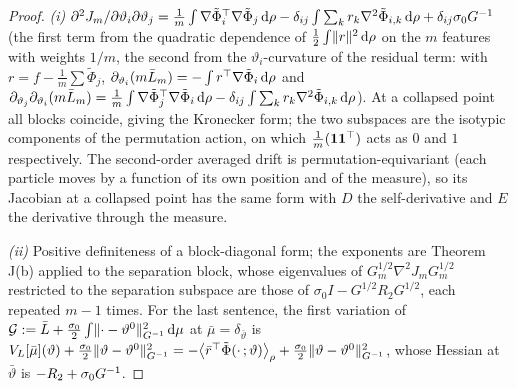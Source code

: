 \begin{proof}
\textit{(i)} $\partial^2J_m/\partial\vartheta_i\partial\vartheta_j
= \frac1m\int\nabla\tilde\Phi_i^\top\nabla\tilde\Phi_j\,\mathrm{d}\rho - \delta_{ij}\int\sum_kr_k\nabla^2\tilde\Phi_{i,k}\,\mathrm{d}\rho
+ \delta_{ij}\sigma_0G^{-1}$ (the first term from the quadratic dependence of $\frac12\int\lVert r\rVert^2\,\mathrm{d}\rho$ on the
$m$ features with weights $1/m$, the second from the $\vartheta_i$-curvature of the residual term:
with $r = f - \frac1m\sum\tilde\Phi_j$,
$\partial_{\vartheta_i}(m\bar L_m) = -\int r^\top\nabla\tilde\Phi_i\,\mathrm{d}\rho$ and
$\partial_{\vartheta_j}\partial_{\vartheta_i}(m\bar L_m)
= \frac1m\int\nabla\tilde\Phi_j^\top\nabla\tilde\Phi_i\,\mathrm{d}\rho - \delta_{ij}\int\sum_kr_k\nabla^2\tilde\Phi_{i,k}\,\mathrm{d}\rho$).
At a collapsed point all blocks coincide, giving the Kronecker form; the two subspaces are the isotypic components of
the permutation action, on which $\frac1m(\mathbf 1\mathbf 1^\top)$ acts as $0$ and $1$ respectively. The second-order
averaged drift is permutation-equivariant (each particle moves by a function of its own position and of the measure),
so its Jacobian at a collapsed point has the same form with $D$ the self-derivative and $E$ the derivative through
the measure.

\smallskip
\textit{(ii)} Positive definiteness of a block-diagonal form; the exponents are Theorem J(b) applied to the separation
block, whose eigenvalues of $G_m^{1/2}\nabla^2J_mG_m^{1/2}$ restricted to the separation subspace are those of
$\sigma_0I - G^{1/2}R_2G^{1/2}$, each repeated $m-1$ times. For the last sentence, the first variation of
$\mathcal G := \bar L + \frac{\sigma_0}{2}\int\lVert \cdot - \vartheta^0\rVert^2_{G^{-1}}\,\mathrm{d}\mu$ at
$\bar\mu = \delta_{\bar\vartheta}$ is
$V_L[\bar\mu](\vartheta) + \frac{\sigma_0}{2}\lVert \vartheta - \vartheta^0\rVert^2_{G^{-1}}
= -\bigl\langle\bar r^\top\tilde\Phi(\cdot\,;\vartheta)\bigr\rangle_\rho + \frac{\sigma_0}{2}\lVert \vartheta - \vartheta^0\rVert^2_{G^{-1}}$,
whose Hessian at $\bar\vartheta$ is $-R_2 + \sigma_0G^{-1}$.


\end{proof}
